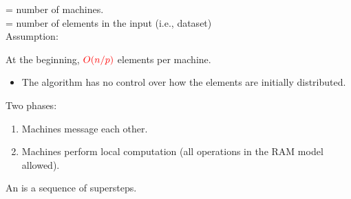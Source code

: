 \documentclass{beamer}
\def\vgap{\vspace{5mm}}
\begin{document}
\begin{frame}
\begin{small}
    \vgap
    
    \vgap 

     = number of machines. \\ 
     = number of elements in the input (i.e., dataset) \\
    Assumption: 
    
    \vgap 
    
    At the beginning, $\textcolor{red}{O(n / p)}$ elements per machine. 
    \begin{itemize} 
        \item The algorithm has no control over how the elements are initially distributed.
    \end{itemize}

    
\end{small}
\end{frame}
\begin{frame}
\begin{small}
    
    \vgap
    
    
    Two phases: 
    
    \begin{enumerate} 
        \item Machines message each other. 
        \pause
        
        \item Machines perform local computation (all operations in the RAM model allowed). 
        
    \end{enumerate}

    \vgap
    \pause
   
    An  is a sequence of supersteps. 
    
    
\end{small}
\end{frame}
\end{document}
